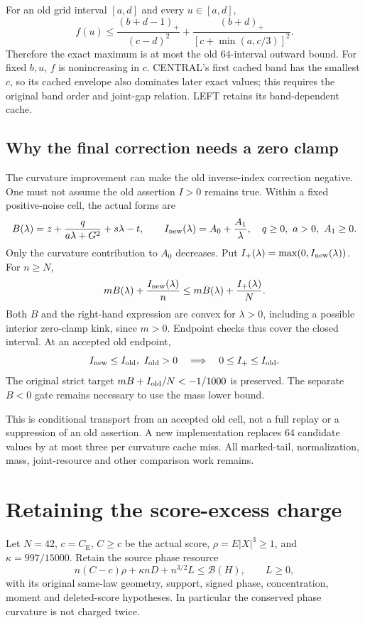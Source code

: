 \documentclass[11pt]{article}
\newcommand{\CE}{C_{\mathrm E}}
\newcommand{\pos}[1]{(#1)_+}
\begin{document}
For an old grid interval $[a,d]$ and every $u\in[a,d]$,
\[
 f(u)\le \frac{\pos{b+d-1}}{(c-d)^2}
       +\frac{\pos{b+d}}{[c+\min(a,c/3)]^2}.
\]
Therefore the exact maximum is at most the old 64-interval outward bound.
For fixed $b,u$, $f$ is nonincreasing in $c$. CENTRAL's first cached band
has the smallest $c$, so its cached envelope also dominates later exact
values; this requires the original band order and joint-gap relation.
LEFT retains its band-dependent cache.

\subsection{Why the final correction needs a zero clamp}
The curvature improvement can make the old inverse-index correction
negative. One must not assume the old assertion $I>0$ remains true.
Within a fixed positive-noise cell, the actual forms are
\[
 B(\lambda)=z+\frac{q}{a\lambda+G^2}+s\lambda-t,\qquad
 I_{\rm new}(\lambda)=A_0+\frac{A_1}{\lambda},
 \quad q\ge0,\ a>0,\ A_1\ge0.
\]
Only the curvature contribution to $A_0$ decreases. Put
$I_+(\lambda)=\max(0,I_{\rm new}(\lambda))$. For $n\ge N$,
\[
 mB(\lambda)+\frac{I_{\rm new}(\lambda)}n
 \le mB(\lambda)+\frac{I_+(\lambda)}N.
\]
Both $B$ and the right-hand expression are convex for $\lambda>0$,
including a possible interior zero-clamp kink, since $m>0$.
Endpoint checks thus cover the closed interval. At an accepted old endpoint,
\[
 I_{\rm new}\le I_{\rm old},\ I_{\rm old}>0
 \quad\Longrightarrow\quad 0\le I_+\le I_{\rm old}.
\]
The original strict target $mB+I_{\rm old}/N<-1/1000$ is preserved.
The separate $B<0$ gate remains necessary to use the mass lower bound.

This is conditional transport from an accepted old cell, not a full replay
or a suppression of an old assertion. A new implementation replaces 64
candidate values by at most three per curvature cache miss. All marked-tail,
normalization, mass, joint-resource and other comparison work remains.

\section{Retaining the score-excess charge}
Let $N=42$, $c=\CE$, $C\ge c$ be the actual score,
$\rho=E|X|^3\ge1$, and $\kappa=997/15000$. Retain the source phase resource
\begin{equation}\label{resource}
 n(C-c)\rho+\kappa nD+n^{3/2}L\le\mathcal B(H),\qquad L\ge0,
\end{equation}
with its original same-law geometry, support, signed phase, concentration,
moment and deleted-score hypotheses. In particular the conserved phase
curvature is not charged twice.
\end{document}
